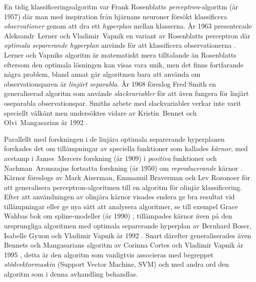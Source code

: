 \documentclass[a4paper, 12pt]{report}
\theoremstyle{definition}
\theoremstyle{remark}
\begin{document}
En tidig klassificeringsalgoritm var Frank Rosenblatts \emph{perceptron}-algoritm (år 1957) \cite{Rosenblatt} där man med inspiration från hjärnans neuroner försökt klassificera \emph{observationer} genom att dra ett \emph{hyper\-plan} mellan klasserna.
År 1963 presenterade \mbox{Aleksandr Lerner} och \mbox{Vladimir Vapnik} en variant av \mbox{Rosenblatts} perceptron där \emph{optimala separerande hyperplan} används för att klassificera observationerna \cite{VapnikLerner1963}.
Lerner och Vapniks algoritm är matematiskt mera tilltalande än Rosenblatts eftersom den optimala lösningen kan visas vara unik, men det finns fortfarande några problem, bland annat går algoritmen bara att använda om observationsparen är \emph{linjärt separabla}.
År 1968 föreslog Fred Smith \cite{Smith} en generaliserad algoritm som använde \emph{slackvariabler} för att även fungera för linjärt oseparabla observationspar.
Smiths arbete med slackvariabler verkar inte varit speciellt välkänt men undersöktes vidare av \mbox{Kristin Bennet} och \mbox{Olvi Mangasarian} år 1992 \cite{BennetMangasarian}.

Parallellt med forskningen i de linjära optimala separerande hyperplanen forskades det om tillämpningar av speciella funktioner som kallades \emph{kärnor}, med avstamp i \mbox{James Mercers} forskning (år 1909) i \emph{positiva} funktioner \cite{Mercer} och \mbox{Nachman Aronszajns} fortsatta forskning (år 1950) om \emph{reproducerande} kärnor \cite{Aronszajn}.
Kärnor föreslogs av Mark Aizerman, Emmanuil Braverman och Lev Rozonoer \cite{Aizerman} för att generalisera perceptron-algoritmen till en algoritm för olinjär klassificering.
Efter att användningen av olinjära kärnor visades endera ge bra resultat vid tillämpningar eller ge nya sätt att analysera algoritmer, se till exempel Grace Wahbas bok om spline-modeller (år 1990) \cite{Grace}, tillämpades kärnor även på den ursprungliga algoritmen med optimala separerande hyperplan av Bernhard Boser, Isabelle Gyuon och Vladimir Vapnik år 1992 \cite{BoserGyuonVapnik}.
Snart därefter generaliserades även Bennets och Mangasarians algoritm av Corinna Cortes och Vladimir Vapnik år 1995 \cite{CortesVapnik}, detta är den algoritm som vanligtvis associeras med begreppet \emph{stödvektormaskin} (Support Vector Machine, SVM) och med andra ord den algoritm som i denna avhandling behandlas.

\end{document}
